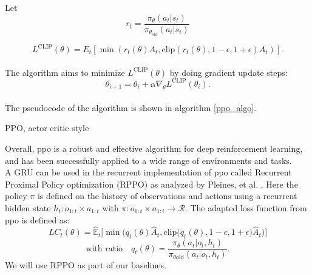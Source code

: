 Let
\begin{equation}
    r_t = \frac{\pi_{\theta}(a_t|s_t)}{\pi_{\theta_{old}}(a_t|s_t)}
\end{equation}

\begin{equation}
        L^{\mathrm{CLIP}}(\theta) = {E}_t \left[ \min \left(r_t(\theta) {A}_t, \text{clip} \left(r_t(\theta), 1-\epsilon, 1+\epsilon \right) {A}_t \right) \right].
\end{equation} \\

The algorithm aims to minimize $L^{\mathrm{CLIP}}(\theta)$ by doing gradient update steps:
\begin{equation}
    \theta_{i+1} = \theta_{i} + \alpha \nabla_{\theta} L^{\mathrm{CLIP}}(\theta_i).
\end{equation}\\

The pseudocode of the algorithm is shown in algorithm \ref{ppo_algo}.
\begin{algorithm}[h]
    \SetAlgoLined
    \begin{algorithmic}
        
    \end{algorithmic}
    \caption{PPO, actor critic style}
    \label{ppo_algo}

\end{algorithm}
Overall, \ac{ppo} is a robust and effective algorithm for deep reinforcement learning, and has been successfully applied to a wide range of environments and tasks.\\

A GRU can be used in the recurrent implementation of \ac{ppo} called Recurrent Proximal Policy optimization (RPPO) as analyzed by Pleines, et al. 
\cite{RPPO}. Here the policy $\pi$ is defined on the history of observations and actions using a recurrent hidden state $h_t : o_{1:t} \times a_{1:t}$ with $\pi : o_{1:t} \times a_{1:t} \rightarrow \mathcal{R}$.
The adapted loss function from \ac{ppo} is defined as:
\begin{equation}
    LC_t(\theta) = \widehat{\mathbb{E}}_t\big[\min\big(q_t(\theta)\widehat{A}_t, \text{clip}\big(q_t(\theta), 1 - \epsilon, 1 + \epsilon\big)\widehat{A}_t\big)\big] \tag{1}
\end{equation}
\begin{equation*}
    \text{with ratio} \quad q_t(\theta) = \frac{\pi_{\theta}(a_t \vert o_t, h_t)}{\pi_{\theta \text{old}}(a_t \vert o_t, h_t)}.
\end{equation*}
We will use RPPO as part of our baselines.


